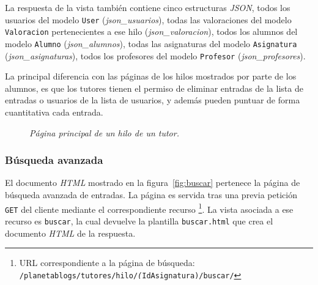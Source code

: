 \documentclass[a4paper, 12pt]{book}
\begin{document}
La respuesta de la vista tambi\'en contiene cinco estructuras \textit{JSON}, todos los usuarios del modelo \texttt{User} (\textit{json\_usuarios}), 
todas las valoraciones del modelo \texttt{Valoracion} pertenecientes a ese hilo (\textit{json\_valoracion}), todos los alumnos del modelo \texttt{Alumno} 
(\textit{json\_alumnos}), todas las asignaturas del modelo \texttt{Asignatura} (\textit{json\_asignaturas}), todos los profesores del modelo \texttt{Profesor} 
(\textit{json\_profesores}).

La principal diferencia con las p\'aginas de los hilos mostrados por parte de los alumnos, es que los tutores tienen el permiso de eliminar entradas de la 
lista de entradas o usuarios de la lista de usuarios, y adem\'as pueden puntuar de forma cuantitativa cada entrada.

\begin{figure}
  \centering
  \caption{\textit{P\'agina principal de un hilo de un tutor.}}
  \label{fig:hilotutor}
\end{figure}


\subsubsection{B\'usqueda avanzada} 
\label{sec:buscar}
El documento \textit{HTML} mostrado en la figura~\ref{fig:buscar} pertenece la p\'agina de b\'usqueda avanzada de entradas. 
La p\'agina es servida tras una previa petici\'on \texttt{GET} del cliente mediante el correspondiente recurso \footnote{URL correspondiente a la p\'agina de 
b\'usqueda: \texttt{/planetablogs/tutores/hilo/\textit(IdAsignatura)/buscar/}}. La vista asociada a ese recurso es \texttt{buscar}, la cual 
devuelve la plantilla \texttt{buscar.html} que crea el documento \textit{HTML} de la respuesta.
\end{document}
